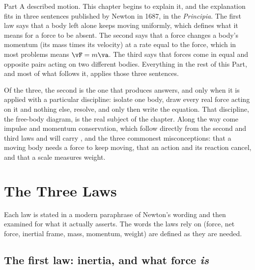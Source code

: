 
\label{ch:newton}

Part A described motion. This chapter begins to explain it, and the explanation fits in three
sentences published by Newton in 1687, in the \emph{Principia}. The first law says that a body left alone keeps moving uniformly,
which defines what it means for a force to be absent. The second says that a force changes a body's
momentum (its mass times its velocity) at a rate equal to the force, which in most problems means
$\vF=m\va$. The third says that forces come in equal and opposite pairs acting on two different bodies.
Everything in the rest of this Part, and most of what follows it, applies those three sentences.

Of the three, the second is the one that produces answers, and only when it is applied with a particular
discipline: isolate one body, draw every real force acting on it and nothing else, resolve, and only
then write the equation. That discipline, the free-body diagram, is the real subject of the chapter.
Along the way come impulse and momentum conservation, which follow directly from the second and third
laws and will carry , and the three commonest misconceptions: that a moving body
needs a force to keep moving, that an action and its reaction cancel, and that a scale measures weight.

\section{The Three Laws}

Each law is stated in a modern paraphrase of Newton's wording and then examined for what it actually
asserts. The words the laws rely on (force, net force, inertial frame, mass, momentum, weight) are
defined as they are needed.

\subsection{The first law: inertia, and what force \emph{is}}

